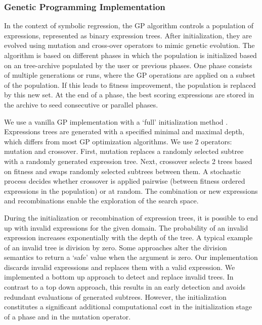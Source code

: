 \subsubsection{Genetic Programming Implementation}
In the context of symbolic regression, the GP algorithm controls a population of expressions, represented as binary expression trees. After initialization, they are evolved using mutation and cross-over operators to mimic genetic evolution.
The algorithm is based on different phases in which the population is initialized based on an tree-archive populated by the user or previous phases. One phase consists of multiple generations or runs, where the GP operations are applied on a subset of the population. If this leads to fitness improvement, the population is replaced by this new set. At the end of a phase, the best scoring expressions are stored in the archive to seed consecutive or parallel phases.

We use a vanilla GP implementation with a `full' initialization method \cite{GP}. Expressions trees are generated with a specified minimal and maximal depth, which differs from most GP optimization algorithms. 
We use 2 operators: mutation and crossover. First, mutation replaces a randomly selected subtree with a randomly generated expression tree. Next, crossover selects 2 trees based on fitness and swaps randomly selected subtrees between them. A stochastic process decides whether crossover is applied pairwise (between fitness ordered expressions in the population) or at random. The combination or new expressions and recombinations enable the exploration of the search space. 

During the initialization or recombination of expression trees, it is possible to end up with invalid expressions for the given domain. The probability of an invalid expression increases exponentially with the depth of the tree. A typical example of an invalid tree is division by zero. Some approaches alter the division semantics to return a `safe' value when the argument is zero. Our implementation discards invalid expressions and replaces them with a valid expression. We implemented a bottom up approach to detect and replace invalid trees. In contrast to a top down approach, this results in an early detection and avoids redundant evaluations of generated subtrees. However, the initialization constitutes a significant additional computational cost in the initialization stage of a phase and in the mutation operator.

